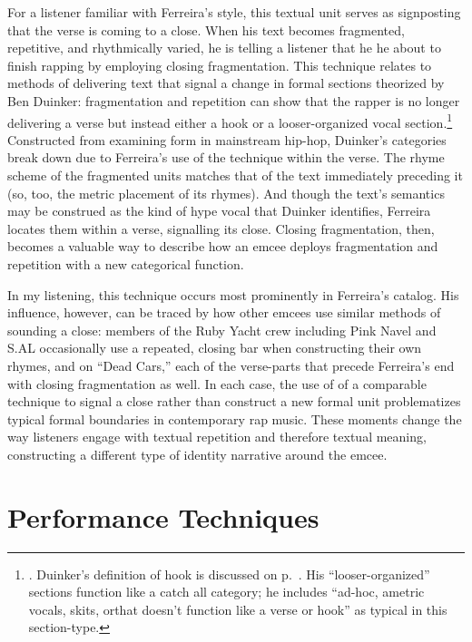 For a listener familiar with Ferreira's style, this textual unit serves as signposting that the verse is
coming to a close. When his text becomes fragmented, repetitive, and rhythmically varied, he is telling
a listener that he he about to finish rapping by employing closing fragmentation. This technique relates
to methods of delivering text that signal a change in formal sections theorized by Ben Duinker:
fragmentation and repetition can show that the rapper is no longer delivering a verse but instead either
a hook or a looser-organized vocal section.\footnote{
    \autocite[98--101]{benduinkerSongFormMainstreaming2020}. Duinker's definition of hook is 
    discussed on p.~\pageref{duinkerhookdef}. His ``looser-organized'' sections function like
    a catch all category; he includes ``ad-hoc, ametric vocals, skits, or\textellipsis [rapping]
    that doesn't function like a verse or hook'' as typical in this section-type.}
Constructed from examining form in mainstream hip-hop, Duinker's categories break down due to Ferreira's 
use of the technique within the verse. The rhyme scheme of the fragmented units matches that of the text
immediately preceding it (so, too, the metric placement of its rhymes). And though the text's semantics
may be construed as the kind of hype vocal that Duinker identifies, Ferreira locates them within a verse,
signalling its close. Closing fragmentation, then, becomes a valuable way to describe how an emcee deploys
fragmentation and repetition with a new categorical function.

In my listening, this technique occurs most prominently in Ferreira's catalog. His influence, however, can
be traced by how other emcees use similar methods of sounding a close: members of the Ruby Yacht crew including
Pink Navel and S.AL occasionally use a repeated, closing bar when constructing their own rhymes, and on ``Dead
Cars,'' each of the verse-parts that precede Ferreira's end with closing fragmentation as well. In each case,
the use of of a comparable technique to signal a close rather than construct a new formal unit problematizes
typical formal boundaries in contemporary rap music. These moments change the way listeners engage with textual
repetition and therefore textual meaning, constructing a different type of identity narrative around the emcee.

\section{Performance Techniques}

